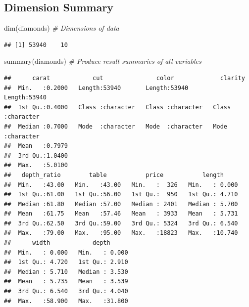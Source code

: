 \documentclass[
]{article}
\newenvironment{Shaded}{\begin{snugshade}}{\end{snugshade}}
\newcommand{\CommentTok}[1]{\textcolor[rgb]{0.56,0.35,0.01}{\textit{#1}}}
\newcommand{\FunctionTok}[1]{\textcolor[rgb]{0.00,0.00,0.00}{#1}}
\newcommand{\NormalTok}[1]{#1}
\begin{document}
\hypertarget{dimension-summary}{%
\subsection{Dimension Summary}\label{dimension-summary}}

\begin{Shaded}
\begin{Highlighting}[]
\FunctionTok{dim}\NormalTok{(diamonds) }\CommentTok{\# Dimensions of data}
\end{Highlighting}
\end{Shaded}

\begin{verbatim}
## [1] 53940    10
\end{verbatim}

\begin{Shaded}
\begin{Highlighting}[]
\FunctionTok{summary}\NormalTok{(diamonds) }\CommentTok{\# Produce result summaries of all variables}
\end{Highlighting}
\end{Shaded}

\begin{verbatim}
##      carat            cut               color             clarity         
##  Min.   :0.2000   Length:53940       Length:53940       Length:53940      
##  1st Qu.:0.4000   Class :character   Class :character   Class :character  
##  Median :0.7000   Mode  :character   Mode  :character   Mode  :character  
##  Mean   :0.7979                                                           
##  3rd Qu.:1.0400                                                           
##  Max.   :5.0100                                                           
##   depth_ratio        table           price           length      
##  Min.   :43.00   Min.   :43.00   Min.   :  326   Min.   : 0.000  
##  1st Qu.:61.00   1st Qu.:56.00   1st Qu.:  950   1st Qu.: 4.710  
##  Median :61.80   Median :57.00   Median : 2401   Median : 5.700  
##  Mean   :61.75   Mean   :57.46   Mean   : 3933   Mean   : 5.731  
##  3rd Qu.:62.50   3rd Qu.:59.00   3rd Qu.: 5324   3rd Qu.: 6.540  
##  Max.   :79.00   Max.   :95.00   Max.   :18823   Max.   :10.740  
##      width            depth       
##  Min.   : 0.000   Min.   : 0.000  
##  1st Qu.: 4.720   1st Qu.: 2.910  
##  Median : 5.710   Median : 3.530  
##  Mean   : 5.735   Mean   : 3.539  
##  3rd Qu.: 6.540   3rd Qu.: 4.040  
##  Max.   :58.900   Max.   :31.800
\end{verbatim}
\end{document}
